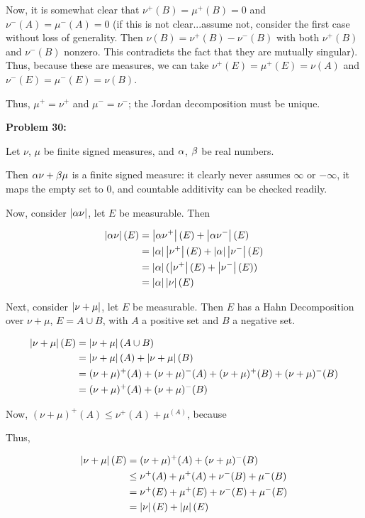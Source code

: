 \documentclass[a4paper,12pt]{article}
\begin{document}
Now, it is somewhat clear that $\nu^+(B) = \mu^+(B) = 0$ and $\nu^-(A) = \mu^-(A) = 0$ (if this is not clear...assume not, consider the first case without loss of generality. Then $\nu(B) = \nu^+(B) - \nu^-(B)$ with both $\nu^+(B)$ and $\nu^-(B)$ nonzero. This contradicts the fact that they are mutually singular). Thus, because these are measures, we can take $\nu^+(E) = \mu^+(E) = \nu(A)$ and $\nu^-(E) = \mu^-(E) = \nu(B)$.

Thus, $\mu^+=\nu^+$ and $\mu^-=\nu^-$; the Jordan decomposition must be unique. 

\shunt

{\bf Problem 30:}

Let $\nu$, $\mu$ be finite signed measures, and $\alpha$, $\beta$ be real numbers.

Then $\alpha\nu + \beta\mu$ is a finite signed measure: it clearly never assumes $\infty$ or $-\infty$, it maps the empty set to $0$, and countable additivity can be checked readily.

Now, consider $\left\lvert \alpha \nu \right\rvert$, let $E$ be measurable. Then

\begin{align*}
\left\lvert \alpha \nu \right\rvert (E)&= \left\lvert \alpha\nu^+ \right\rvert(E) + \left\lvert \alpha\nu^- \right\rvert(E)\\
&= \left\lvert \alpha \right\rvert\left\lvert \nu^+ \right\rvert(E) + \left\lvert \alpha \right\rvert\left\lvert \nu^- \right\rvert(E)\\
&= \left\lvert \alpha \right\rvert(\left\lvert \nu^+ \right\rvert(E) + \left\lvert \nu^- \right\rvert(E))\\
&= \left\lvert \alpha \right\rvert\left\lvert \nu \right\rvert(E)\\
\end{align*}

Next, consider $\left\lvert \nu + \mu \right\rvert$, let $E$ be measurable. Then $E$ has a Hahn Decomposition over $\nu+\mu$, $E = A \cup B$, with $A$ a positive set and $B$ a negative set. 

\begin{align*}
\left\lvert \nu + \mu \right\rvert(E) &= \left\lvert \nu + \mu \right\rvert(A \cup B)\\
&= \left\lvert \nu + \mu \right\rvert(A)+\left\lvert \nu + \mu \right\rvert(B)\\
&=(\nu+\mu)^+(A) + (\nu+\mu)^-(A) +(\nu+\mu)^+(B) + (\nu+\mu)^-(B)\\
&=(\nu+\mu)^+(A) + (\nu+\mu)^-(B)\\
\end{align*}

Now, $(\nu+\mu)^+(A) \leq \nu^+(A) + \mu^(A)$, because %

Thus,

\begin{align*}
\left\lvert \nu + \mu \right\rvert(E) &= (\nu+\mu)^+(A) + (\nu+\mu)^-(B)\\
&\leq \nu^+(A) + \mu^+(A) + \nu^-(B) + \mu^-(B)\\
&= \nu^+(E) + \mu^+(E) + \nu^-(E) + \mu^-(E)\\
&= \left\lvert \nu \right\rvert(E) + \left\lvert \mu \right\rvert(E)
\end{align*}
\end{document}
